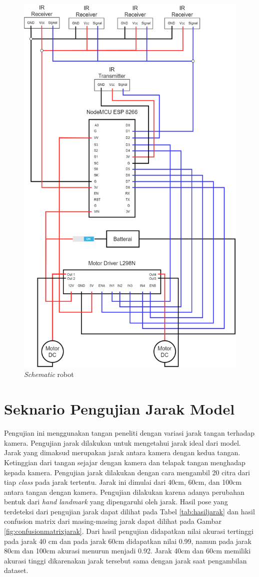 \begin{figure}[H]
  \centering
  \includegraphics[width=0.5\linewidth]{../Gambar/schematic.png}
  \caption{\emph{Schematic} robot}
  \label{fig:schematic}
\end{figure}

\section{Seknario Pengujian Jarak Model}
Pengujian ini menggunakan tangan peneliti dengan variasi jarak tangan terhadap kamera. Pengujian jarak dilakukan untuk mengetahui jarak ideal dari model. Jarak yang dimaksud merupakan jarak antara kamera dengan  kedua tangan. Ketinggian dari tangan sejajar dengan kamera dan telapak tangan menghadap kepada kamera. Pengujian jarak dilakukan dengan cara mengambil 20 citra dari tiap \emph{class} pada jarak tertentu. Jarak ini dimulai dari 40cm, 60cm, dan 100cm antara tangan dengan kamera. Pengujian dilakukan karena adanya perubahan bentuk dari \emph{hand landmark} yang dipengaruhi oleh jarak. Hasil pose yang terdeteksi dari pengujian jarak dapat dilihat pada Tabel \ref{tab:hasiljarak} dan hasil confusion matrix dari masing-masing jarak dapat dilihat pada Gambar \ref{fig:confusionmatrixjarak}. Dari hasil pengujian didapatkan nilai akurasi tertinggi pada jarak 40 cm dan pada jarak 60cm didapatkan nilai 0.99, namun pada jarak 80cm dan 100cm akurasi menurun menjadi 0.92. Jarak 40cm dan 60cm memiliki akurasi tinggi dikarenakan jarak tersebut sama dengan jarak saat pengambilan dataset.

